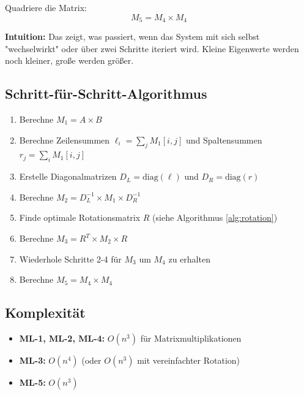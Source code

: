 \documentclass[a4paper,12pt]{article}
\begin{document}
Quadriere die Matrix:
$$M_5 = M_4 \times M_4$$

\textbf{Intuition:} Das zeigt, was passiert, wenn das System mit sich selbst "wechselwirkt" oder über zwei Schritte iteriert wird. Kleine Eigenwerte werden noch kleiner, große werden größer.

\subsection{Schritt-für-Schritt-Algorithmus}

\begin{enumerate}
\item Berechne $M_1 = A \times B$

\item Berechne Zeilensummen $\ell_i = \sum_j M_1[i, j]$ und Spaltensummen $r_j = \sum_i M_1[i, j]$

\item Erstelle Diagonalmatrizen $D_L = \text{diag}(\ell)$ und $D_R = \text{diag}(r)$

\item Berechne $M_2 = D_L^{-1} \times M_1 \times D_R^{-1}$

\item Finde optimale Rotationsmatrix $R$ (siehe Algorithmus \ref{alg:rotation})

\item Berechne $M_3 = R^T \times M_2 \times R$

\item Wiederhole Schritte 2-4 für $M_3$ um $M_4$ zu erhalten

\item Berechne $M_5 = M_4 \times M_4$
\end{enumerate}

\subsection{Komplexität}

\begin{itemize}
\item \textbf{ML-1, ML-2, ML-4:} $O(n^3)$ für Matrixmultiplikationen
\item \textbf{ML-3:} $O(n^4)$ (oder $O(n^3)$ mit vereinfachter Rotation)
\item \textbf{ML-5:} $O(n^3)$
\end{itemize}

\end{document}

